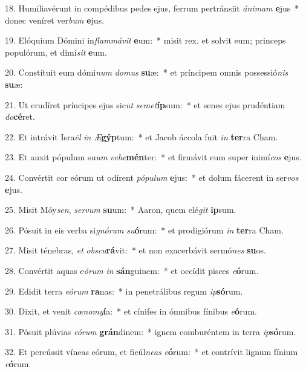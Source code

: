 18. Humiliavérunt in compédibus pedes ejus, ferrum pertránsiit \textit{á}\textit{ni}\textit{mam} \textbf{e}jus~*  donec veníret ver\textit{bum} \textbf{e}jus.\

19. Elóquium Dómini in\textit{flam}\textit{má}\textit{vit} \textbf{e}um:~*  misit rex, et solvit eum; princeps populórum, et dimí\textit{sit} \textbf{e}um.\

20. Constítuit eum dómi\textit{num} \textit{do}\textit{mus} \textbf{su}æ:~*  et príncipem omnis possessió\textit{nis} \textbf{su}æ:\

21. Ut erudíret príncipes ejus sic\textit{ut} \textit{se}\textit{met}\textbf{íp}sum:~*  et senes ejus prudéntiam \textit{do}\textbf{cé}ret.\

22. Et intrávit Isra\textit{ël} \textit{in} \textit{Æ}\textbf{gýp}tum:~*  et Jacob áccola fuit \textit{in} \textbf{ter}ra Cham.\

23. Et auxit pópulum su\textit{um} \textit{ve}\textit{he}\textbf{mén}ter:~*  et firmávit eum super inimí\textit{cos} \textbf{e}jus.\

24. Convértit cor eórum ut odírent \textit{pó}\textit{pu}\textit{lum} \textbf{e}jus:~*  et dolum fácerent in ser\textit{vos} \textbf{e}jus.\

25. Misit Móy\textit{sen}, \textit{ser}\textit{vum} \textbf{su}um:~*  Aaron, quem elé\textit{git} \textbf{ip}sum.\

26. Pósuit in eis verba si\textit{gnó}\textit{rum} \textit{su}\textbf{ó}rum:~*  et prodigiórum \textit{in} \textbf{ter}ra Cham.\

27. Misit ténebras, \textit{et} \textit{obs}\textit{cu}\textbf{rá}vit:~*  et non exacerbávit sermó\textit{nes} \textbf{su}os.\

28. Convértit aquas e\textit{ó}\textit{rum} \textit{in} \textbf{sán}guinem:~*  et occídit pisces \textit{e}\textbf{ó}rum.\

29. Edidit terra \textit{e}\textit{ó}\textit{rum} \textbf{ra}nas:~*  in penetrálibus regum \textit{ip}\textbf{só}rum.\

30. Dixit, et venit \textit{cœ}\textit{no}\textit{my}\textbf{í}a:~*  et cínifes in ómnibus fínibus \textit{e}\textbf{ó}rum.\

31. Pósuit plúvias \textit{e}\textit{ó}\textit{rum} \textbf{grán}dinem:~*  ignem comburéntem in terra \textit{ip}\textbf{só}rum.\

32. Et percússit víneas eórum, et ficúl\textit{ne}\textit{as} \textit{e}\textbf{ó}rum:~*  et contrívit lignum fínium \textit{e}\textbf{ó}rum.\

